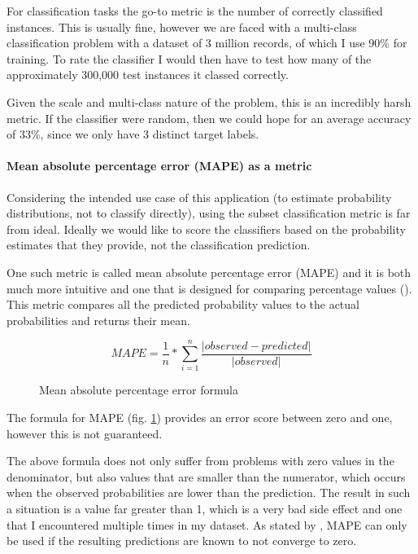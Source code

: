 \documentclass{article}
\begin{document}
	For classification tasks the go-to metric is the number of correctly classified instances. This is usually fine, however we are faced with a multi-class classification problem with a dataset of 3 million records, of which I use 90\% for training. To rate the classifier I would then have to test how many of the approximately 300,000 test instances it classed correctly.

	Given the scale and multi-class nature of the problem, this is an incredibly harsh metric. If the classifier were random, then we could hope for an average accuracy of 33\%, since we only have 3 distinct target labels.

	\paragraph{Mean absolute percentage error (MAPE) as a metric}

	Considering the intended use case of this application (to estimate probability distributions, not to classify directly), using the subset classification metric is far from ideal. Ideally we would like to score the classifiers based on the probability estimates that they provide, not the classification prediction.

	One such metric is called mean absolute percentage error (MAPE) and it is both much more intuitive and one that is designed for comparing percentage values (\cite{MAPE}). This metric compares all the predicted probability values to the actual probabilities and returns their mean.

	\begin{figure}[H]
		\begin{equation}
			MAPE = \frac{1}{n} * \sum\limits_{i=1}^n \frac{|observed - predicted|}{|observed|}
		\end{equation}
		\caption{Mean absolute percentage error formula}
		\label{fig:mape}
	\end{figure}


	The formula for MAPE (fig. \ref{fig:mape}) provides an error score between zero and one, however this is not guaranteed.
	
	The above formula does not only suffer from problems with zero values in the denominator, but also values that are smaller than the numerator, which occurs when the observed probabilities are lower than the prediction. The result in such a situation is a value far greater than 1, which is a very bad side effect and one that I encountered multiple times in my dataset. As stated by \cite{mape_for_regression}, MAPE can only be used if the resulting predictions are known to not converge to zero.
	
\end{document}
